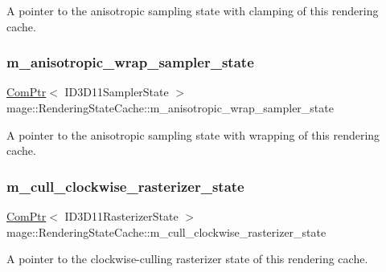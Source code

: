 A pointer to the anisotropic sampling state with clamping of this rendering cache. \hypertarget{structmage_1_1_rendering_state_cache_ac44316b27ee83a1aeb9f8afc26b5a743}{}\label{structmage_1_1_rendering_state_cache_ac44316b27ee83a1aeb9f8afc26b5a743} 
\subsubsection{\texorpdfstring{m\+\_\+anisotropic\+\_\+wrap\+\_\+sampler\+\_\+state}{m\_anisotropic\_wrap\_sampler\_state}}
{\footnotesize\ttfamily \hyperlink{namespacemage_ae74f374780900893caa5555d1031fd79}{Com\+Ptr}$<$ I\+D3\+D11\+Sampler\+State $>$ mage\+::\+Rendering\+State\+Cache\+::m\+\_\+anisotropic\+\_\+wrap\+\_\+sampler\+\_\+state\hspace{0.3cm}{\ttfamily [private]}}

A pointer to the anisotropic sampling state with wrapping of this rendering cache. \hypertarget{structmage_1_1_rendering_state_cache_a4194ce92cb7cccd2ae219e13eaf7cfdc}{}\label{structmage_1_1_rendering_state_cache_a4194ce92cb7cccd2ae219e13eaf7cfdc} 
\subsubsection{\texorpdfstring{m\+\_\+cull\+\_\+clockwise\+\_\+rasterizer\+\_\+state}{m\_cull\_clockwise\_rasterizer\_state}}
{\footnotesize\ttfamily \hyperlink{namespacemage_ae74f374780900893caa5555d1031fd79}{Com\+Ptr}$<$ I\+D3\+D11\+Rasterizer\+State $>$ mage\+::\+Rendering\+State\+Cache\+::m\+\_\+cull\+\_\+clockwise\+\_\+rasterizer\+\_\+state\hspace{0.3cm}{\ttfamily [private]}}

A pointer to the clockwise-\/culling rasterizer state of this rendering cache. \hypertarget{structmage_1_1_rendering_state_cache_a825b91a2cb5ab76375d1ebebe7a0ef74}{}\label{structmage_1_1_rendering_state_cache_a825b91a2cb5ab76375d1ebebe7a0ef74} 
